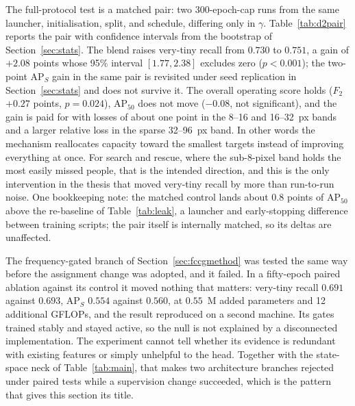 The full-protocol test is a matched pair: two 300-epoch-cap runs
from the same launcher, initialisation, split, and schedule, differing only in
$\gamma$. Table~\ref{tab:d2pair} reports the pair with confidence intervals
from the bootstrap of Section~\ref{sec:stats}. The blend raises very-tiny
recall from $0.730$ to $0.751$, a gain of $\mathbf{+2.08}$ points whose 95\%
interval $[1.77, 2.38]$ excludes zero ($p<0.001$); the two-point
$\mathrm{AP}_S$ gain in the same pair is revisited under seed replication in
Section~\ref{sec:stats} and does not survive it. The overall operating score
holds ($F_2$ $+0.27$ points, $p=0.024$), $\mathrm{AP}_{50}$ does not move
($-0.08$, not significant), and the gain is paid for with losses of about one
point in the 8--16 and 16--32~px bands and a larger relative loss in the
sparse 32--96~px band. In
other words the mechanism reallocates capacity toward the smallest targets
instead of improving everything at once. For search and rescue, where the
sub-8-pixel band holds the most easily missed people, that is the intended
direction, and this is the only intervention in the thesis that moved
very-tiny recall by more than run-to-run noise. One bookkeeping note: the
matched control lands about $0.8$ points of $\mathrm{AP}_{50}$ above the
re-baseline of Table~\ref{tab:leak}, a launcher and early-stopping difference
between training scripts; the pair itself is internally matched, so its deltas
are unaffected.

The frequency-gated branch of Section~\ref{sec:fccgmethod} was tested the same
way before the assignment change was adopted, and it failed. In a fifty-epoch
paired ablation against its control it moved nothing that matters: very-tiny
recall $0.691$ against $0.693$, $\mathrm{AP}_S$ $0.554$ against $0.560$, at
$0.55$~M added parameters and 12 additional GFLOPs, and the result reproduced
on a second machine. Its gates trained stably and stayed active, so the null is
not explained by a disconnected implementation. The experiment cannot tell
whether its evidence is redundant with existing features or simply unhelpful
to the head. Together with the state-space neck of
Table~\ref{tab:main}, that makes two architecture branches rejected under
paired tests while a supervision change succeeded, which is the pattern that
gives this section its title.

